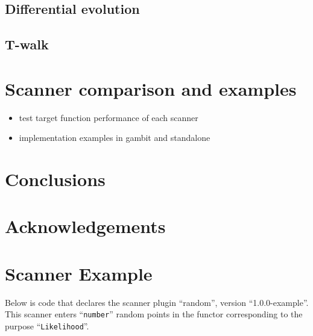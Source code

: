 \documentclass[11pt,a4paper]{article}
\begin{document}
\subsection{Differential evolution}
\subsection{T-walk}

\section{Scanner comparison and examples}
\begin{itemize}
\item test target function performance of each scanner
\item implementation examples in gambit and standalone
\end{itemize}

\section{Conclusions}

\section{Acknowledgements}

\appendix

\section{Scanner Example}

Below is code that declares the scanner plugin ``random'', version ``1.0.0-example''.
This scanner enters ``\texttt{number}'' random points in the functor corresponding to
the purpose ``\texttt{Likelihood}''.
\end{document}
